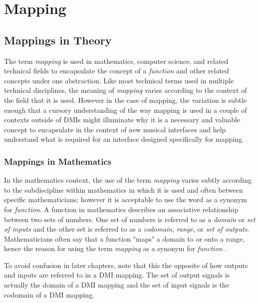 \resetdatestamp

\newcommand\Dfrac[2]{\frac{\displaystyle #1}{\displaystyle #2}}
\newcommand{\mathBF}[1]{\mbox{\boldmath $#1$}}
\newcommand{\C}[1]{\mathBF{#1}}

\chapter{Mapping}

\section{Mappings in Theory}

The term \emph{mapping} is used in mathematics, computer science, and related technical fields to encapsulate the concept of a \emph{function} and other related concepts under one abstraction. Like most technical terms used in multiple technical disciplines, the meaning of \emph{mapping} varies according to the context of the field that it is used. However in the case of mapping, the variation is subtle enough that a cursory understanding of the way mapping is used in a couple of contexts outside of DMIs might illuminate why it is a necessary and valuable concept to encapsulate in the context of new musical interfaces and help understand what is required for an interface designed specifically for mapping.

\subsection{Mappings in Mathematics}
\label{sec:Mappings in Mathematics}

In the mathematics context, the use of the term \emph{mapping} varies subtly according to the subdiscipline within mathematics in which it is used and often between specific mathematicians; however it is acceptable to use the word as a synonym for \emph{function}. A function in mathematics describes an associative relationship between two sets of numbers. One set of numbers is referred to as a \emph{domain} or \emph{set of inputs} and the other set is referred to as a \emph{codomain}, \emph{range}, or \emph{set of outputs}. Mathematicians often say that a function "maps" a domain to or onto a range, hence the reason for using the term \emph{mapping} as a synonym for \emph{function} \cite{functionMapping}.

To avoid confusion in later chapters, note that this the opposite of how outputs and inputs are referred to in a DMI mapping. The set of output signals is actually the domain of a DMI mapping and the set of input signals is the codomain of a DMI mapping. 

